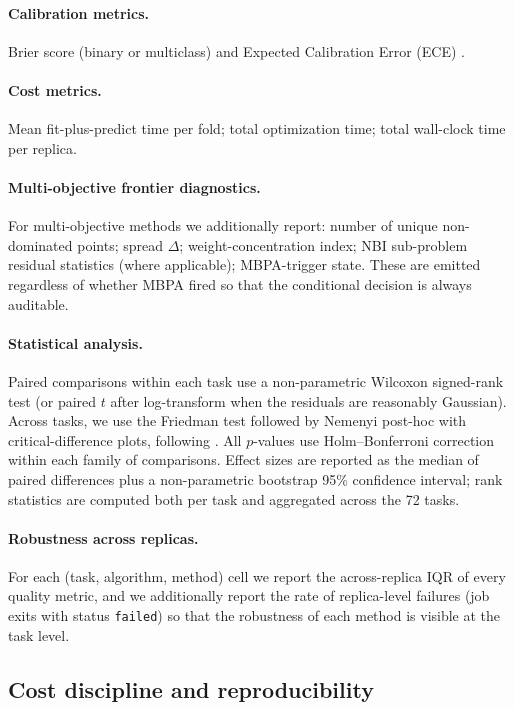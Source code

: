 \paragraph{Calibration metrics.} Brier score (binary or multiclass)
and Expected Calibration Error (ECE)
\citep{naeini2015calibration}.

\paragraph{Cost metrics.} Mean fit-plus-predict time per fold;
total optimization time; total wall-clock time per replica.

\paragraph{Multi-objective frontier diagnostics.} For
multi-objective methods we additionally report: number of unique
non-dominated points; spread $\Delta$; weight-concentration index;
NBI sub-problem residual statistics (where applicable); MBPA-trigger
state. These are emitted regardless of whether MBPA fired so that
the conditional decision is always auditable.

\paragraph{Statistical analysis.} Paired comparisons within each task
use a non-parametric Wilcoxon signed-rank test (or paired $t$ after
log-transform when the residuals are reasonably Gaussian). Across
tasks, we use the Friedman test followed by Nemenyi post-hoc with
critical-difference plots, following
\citet{demsar2006statistical}. All $p$-values use Holm--Bonferroni
correction within each family of comparisons. Effect sizes are
reported as the median of paired differences plus a non-parametric
bootstrap 95\% confidence interval; rank statistics are computed
both per task and aggregated across the 72 tasks.

\paragraph{Robustness across replicas.} For each (task, algorithm,
method) cell we report the across-replica IQR of every quality
metric, and we additionally report the rate of replica-level
failures (job exits with status \texttt{failed}) so that the
robustness of each method is visible at the task level.

\subsection{Cost discipline and reproducibility}
\label{sec:exp-cost-discipline}
